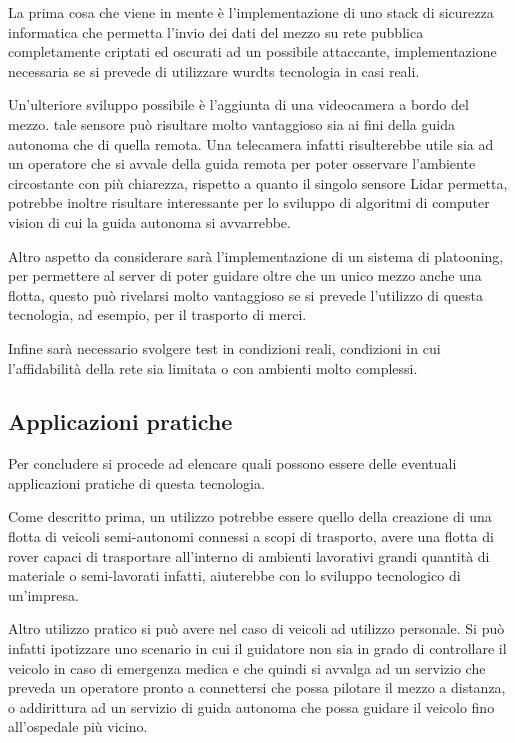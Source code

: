\noindent La prima cosa che viene in mente è l'implementazione di uno stack di sicurezza informatica che permetta l'invio dei dati del mezzo su rete pubblica completamente criptati ed oscurati ad un possibile attaccante, implementazione necessaria se si prevede di utilizzare wurdts tecnologia in casi reali.

\noindent Un'ulteriore sviluppo possibile è l'aggiunta di una videocamera a bordo del mezzo. tale sensore può risultare molto vantaggioso sia ai fini della guida autonoma che di quella remota. Una telecamera infatti risulterebbe utile sia ad un operatore che si avvale della guida remota per poter osservare l'ambiente circostante con più chiarezza, rispetto a quanto il singolo sensore Lidar permetta, potrebbe inoltre risultare interessante per lo sviluppo di algoritmi di computer vision di cui la guida autonoma si avvarrebbe. 

\noindent Altro aspetto da considerare sarà l'implementazione di un sistema di platooning, per permettere al  server di poter guidare oltre che un unico mezzo anche una flotta, questo può rivelarsi molto vantaggioso se si prevede l'utilizzo di questa tecnologia, ad esempio, per il trasporto di merci.

\noindent Infine sarà necessario svolgere test in condizioni reali, condizioni in cui l'affidabilità della rete sia limitata o con ambienti molto complessi.

\subsection{Applicazioni pratiche}
Per concludere si procede ad elencare quali possono essere delle eventuali applicazioni pratiche di questa tecnologia.

\noindent Come descritto prima, un utilizzo potrebbe essere quello della creazione di una flotta di veicoli semi-autonomi connessi a scopi di trasporto, avere una flotta di rover capaci di trasportare all'interno di ambienti lavorativi grandi quantità di materiale o semi-lavorati infatti, aiuterebbe con lo sviluppo tecnologico di un'impresa.

\noindent Altro utilizzo pratico si può avere nel caso di veicoli ad utilizzo personale. Si può infatti ipotizzare uno scenario in cui il guidatore non sia in grado di controllare il veicolo in caso di emergenza medica e che quindi si avvalga ad un servizio che preveda un operatore pronto a connettersi che possa pilotare il mezzo a distanza, o addirittura ad un servizio di guida autonoma che possa guidare il veicolo fino all'ospedale più vicino. 
